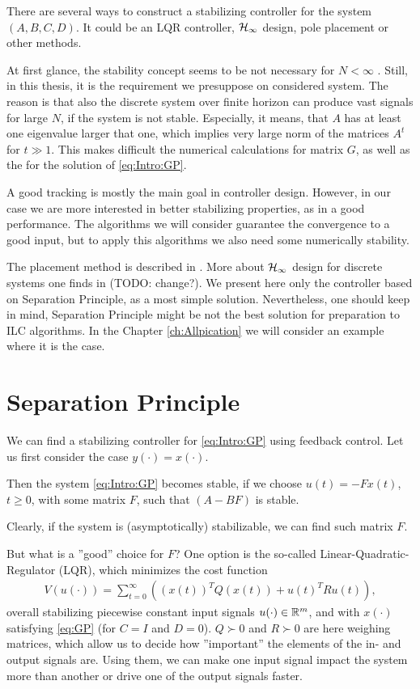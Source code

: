 There are several ways to construct a stabilizing controller for the system $(A, B, C, D)$. It could be an LQR controller, $\mathcal{H}_{\infty}$ design, pole placement or other methods.



At first glance, the stability concept seems to be not necessary for $N < \infty$ . Still, in this thesis, it is the requirement we presuppose on considered system. The reason is that also the discrete system over finite horizon can produce vast signals for large $N$, if the system is not stable. Especially, it means, that $A$ has at least one eigenvalue larger that one, which implies very large norm of the matrices $A^t$ for $t \gg 1$. This makes difficult the numerical calculations for matrix $G$, as well as the for the solution of \eqref{eq:Intro:GP}. 

 A good tracking is mostly the main goal in controller design. However, in our case we are more interested in better stabilizing properties, as in a good performance. The algorithms we will consider guarantee the convergence to a good input, but to apply this algorithms we also need some numerically stability. 

The placement method is described in \cite{LKT}. More about $\mathcal{H}_{\infty}$ design for discrete systems one finds in \cite{discrHinf} (TODO: change?). 
We present here only the controller based on Separation Principle, as a most simple solution. Nevertheless, one should keep in mind, Separation Principle might be not the best solution for preparation to ILC algorithms. In the Chapter \ref{ch:Allpication} we will consider an example where it is the case. 

\section{Separation Principle} 

We can find a stabilizing controller for \eqref{eq:Intro:GP} using feedback control.
Let us first consider the case $y(\cdot) = x(\cdot)$.

Then the system \eqref{eq:Intro:GP} becomes stable, if we choose $u(t) = -Fx(t)$, $t \geq 0$, with some matrix $F$, such that $(A - BF)$ is stable.

Clearly, if the system is (asymptotically) stabilizable, we can find such matrix $F$. 

But what is a ''good'' choice for $F$? One option is the so-called Linear-Quadratic-Regulator (LQR), which minimizes the cost function 
\begin{align}
\label{eq:costFcn}
V(u(\cdot)) = \sum_{t = 0}^\infty \left( (x(t))^T Q (x(t)) + u(t)^T R u(t)\right),
\end{align}
overall stabilizing piecewise constant input signals $u(\cdot) \in {\mathbb{R}}^m$, and with $x(\cdot)$ satisfying \eqref{eq:GP} (for $C = I$ and $D = 0$). 
$Q \succ 0$ and $R \succ 0$ are here weighing matrices, which allow us to decide how ''important'' the elements of the in- and output signals are.  
Using them, we can make one input signal impact the system more than another or drive one of the output signals faster. 

